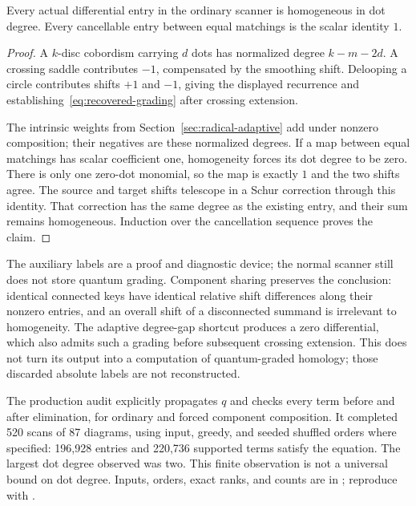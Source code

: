 \begin{proposition}
Every actual differential entry in the ordinary scanner is homogeneous
in dot degree. Every cancellable entry between equal matchings is the
scalar identity $1$.
\end{proposition}
\begin{proof}
A $k$-disc cobordism carrying $d$ dots has normalized degree $k-m-2d$.
A crossing saddle contributes $-1$, compensated by the smoothing
shift. Delooping a circle contributes shifts $+1$ and $-1$, giving
the displayed recurrence and establishing~\eqref{eq:recovered-grading}
after crossing extension.

The intrinsic weights from Section~\ref{sec:radical-adaptive} add under
nonzero composition; their negatives are these normalized degrees.
If a map between equal matchings has scalar coefficient one,
homogeneity forces its dot degree to be zero. There is only one
zero-dot monomial, so the map is exactly $1$ and the two shifts agree.
The source and target shifts telescope in a Schur correction through
this identity. That correction has the same degree as the existing
entry, and their sum remains homogeneous. Induction over the
cancellation sequence proves the claim.
\end{proof}

The auxiliary labels are a proof and diagnostic device; the normal
scanner still does not store quantum grading. Component sharing
preserves the conclusion: identical connected keys have identical
relative shift differences along their nonzero entries, and an
overall shift of a disconnected summand is irrelevant to homogeneity.
The adaptive degree-gap shortcut produces a zero differential, which
also admits such a grading before subsequent crossing extension.
This does not turn its output into a computation of quantum-graded
homology; those discarded absolute labels are not reconstructed.

The production audit explicitly propagates $q$ and checks every term
before and after elimination, for ordinary and forced component
composition. It completed 520 scans of 87 diagrams, using input,
greedy, and seeded shuffled orders where specified: 196,928 entries
and 220,736 supported terms satisfy the equation. The largest dot
degree observed was two. This finite observation is not a universal
bound on dot degree. Inputs, orders, exact ranks, and counts are in
; reproduce with
.

